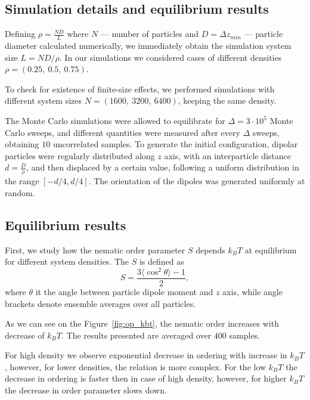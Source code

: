 \subsection{Simulation details and equilibrium results}
\label{subsec:simulation_details}

Defining $\rho = \frac{N D}{L}$ where $N$ --- number of particles and $D = \Delta z_{min}$ --- particle diameter calculated numerically, we immediately obtain the simulation system size $L = N D/ \rho$. In our simulations we considered cases of different densities $\rho = (0.25,\ 0.5,\ 0.75)$.

To check for existence of finite-size effects, we performed simulations with different system sizes $N = (1600,\ 3200,\ 6400)$, keeping the same density.

The Monte Carlo simulations were allowed to equilibrate for $\Delta = 3 \cdot 10^5$ Monte Carlo sweeps, and different quantities were measured after every $\Delta$ sweeps, obtaining $10$ uncorrelated samples. To generate the initial configuration, dipolar particles were regularly distributed along $z$ axis, with an interparticle distance $d = \frac{D}{\rho}$, and then displaced by a certain value, following a uniform distribution in the range $[-d/4, d/4]$. The orientation of the dipoles was generated uniformly at random.

\subsection{Equilibrium results}
\label{subsec:monte_carlo_results}
First, we study how the nematic order parameter $S$ depends $k_BT$ at equilibrium for different system densities. The $S$ is defined as
\begin{equation}
\label{eq:nematic_order_parameter}
	S = \frac{3 \langle\cos^2 \theta\rangle - 1}{2}
	,
\end{equation}
where $\theta$ it the angle between particle dipole moment and $z$ axis, while angle brackets denote ensemble averages over all particles.

As we can see on the Figure~\ref{fig:op_kbt}, the nematic order increases with decrease of $k_BT$. The results presented are averaged over $400$ samples. 

For high density we observe exponential decrease in ordering with increase in $k_BT$, however, for lower densities, the relation is more complex. For the low $k_BT$ the decrease in ordering is faster then in case of high density, however, for higher $k_BT$ the decrease in order parameter slows down.  

